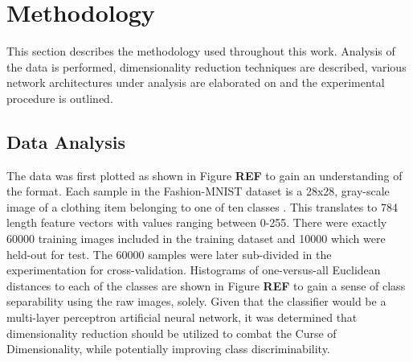 \documentclass[conference]{IEEEtran}
\begin{document}
\section{Methodology} \label{Methodology}
	This section describes the methodology used throughout this work.  Analysis of the data is performed, dimensionality reduction techniques are described, various network architectures under analysis are elaborated on and the experimental procedure is outlined.

	\subsection{Data Analysis}
	The data was first plotted as shown in Figure \textbf{REF} to gain an understanding of the format.  Each sample in the Fashion-MNIST dataset is a 28x28, gray-scale image of a clothing item belonging to one of ten classes \cite{Xiao2017FashionMNIST}. This translates to 784 length feature vectors with values ranging between 0-255. There were exactly 60000 training images included in the  training dataset and 10000 which were held-out for test.  The 60000 samples were later sub-divided in the experimentation for cross-validation. Histograms of one-versus-all Euclidean distances to each of the classes are shown in Figure \textbf{REF} to gain a sense of class separability using the raw images, solely.  Given that the classifier would be a multi-layer perceptron artificial neural network, it was determined that dimensionality reduction should be utilized to combat the Curse of Dimensionality, while potentially improving class discriminability.
	
\end{document}
